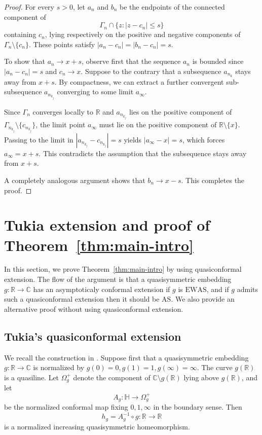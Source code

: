 \documentclass[11pt]{amsart}
\numberwithin{equation}{section}
\theoremstyle{definition} %
\theoremstyle{remarkstyle}
\newcommand{\R}{\mathbb{R}}
\newcommand{\C}{\mathbb{C}}
\newcommand{\Hh}{\mathbb{H}}
\begin{document}
\begin{proof}
For every $s>0$, let $a_n$ and $b_n$ be the endpoints of the connected component of 
\[
\Gamma_n \cap \{z : |z-c_n| \leq s\}
\]
containing $c_n$, lying respectively on the positive and negative components of $\Gamma_n \setminus \{c_n\}$.
These points satisfy $|a_n-c_n|=|b_n-c_n|=s$.

To show that $a_n \to x+s$, observe first that the sequence $a_n$ is bounded since $|a_n - c_n| = s$ and $c_n \to x$. 
Suppose to the contrary that a subsequence $a_{n_k}$ stays away from $x+s$. By compactness, we can extract a further convergent sub-subsequence $a_{n_{k_j}}$ converging to some limit $a_\infty$. 

Since $\Gamma_n$ converges locally to $\mathbb{R}$ and $a_{n_{k_j}}$ lies on the positive component of $\Gamma_{n_{k_j}}\setminus\{c_{n_{k_j}}\}$, the limit point $a_\infty$ must lie on the positive component of $\mathbb{R}\setminus\{x\}$. 
Passing to the limit in $|a_{n_{k_j}} - c_{n_{k_j}}| = s$ yields $|a_\infty - x| = s$, which forces $a_\infty =x+s$. 
This contradicts the assumption that the subsequence stays away from $x+s$.

A completely analogous argument shows that $b_n \to x-s$. This completes the proof.
\end{proof}

\section{Tukia extension and proof of Theorem~\ref{thm:main-intro}}\label{sec:tukia_extension_and_proof_of_theorem_ref_thm_main_intro}

In this section, we prove Theorem~\ref{thm:main-intro} by using quasiconformal extension. 
The flow of the argument is that a quasisymmetric embedding $g\colon \mathbb R \to \mathbb C$ has an asymptoticaly conformal extension if $g$ is $\mathrm{EWAS}$, and if $g$ admits such a quasiconformal extension then it should be $\mathrm{AS}$.
We also provide an alternative proof without using quasiconformal extension.

\subsection{Tukia's quasiconformal extension}

We recall the construction in \cite[Sections~3--5]{TukiaExtension}.  Suppose first that a quasisymmetric embedding $g\colon\R\to\C$ is normalized by $g(0)=0, g(1)=1, g(\infty)=\infty$.
The curve $g(\mathbb R)$ is a quasiline.  
Let $\Omega_g^+$ denote the component of $\mathbb C \setminus g(\mathbb R)$ lying above $g(\mathbb R)$, and let
\[
 A_g\colon\Hh\to\Omega_g^+
\]
be the normalized conformal map fixing $0,1,\infty$ in the boundary sense.
Then
\[
 h_g=A_g^{-1}\circ g\colon\R\to\R
\]
is a normalized increasing quasisymmetric homeomorphism.
\end{document}
